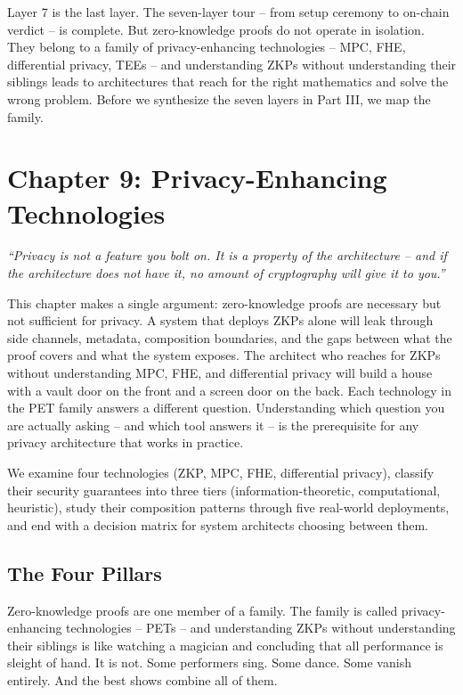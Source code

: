 \documentclass[
  11pt,
  openany]{report}
\begin{document}
Layer 7 is the last layer. The seven-layer tour -- from setup ceremony to
on-chain verdict -- is complete. But zero-knowledge proofs do not operate in
isolation. They belong to a family of privacy-enhancing technologies -- MPC,
FHE, differential privacy, TEEs -- and understanding ZKPs without understanding
their siblings leads to architectures that reach for the right mathematics and
solve the wrong problem. Before we synthesize the seven layers in Part III, we
map the family.

\chapter{Chapter 9: Privacy-Enhancing
Technologies}\label{chapter-9-privacy-enhancing-technologies}

\emph{``Privacy is not a feature you bolt on. It is a property of the
architecture -- and if the architecture does not have it, no amount of
cryptography will give it to you.''}

\par\vspace{18pt}

This chapter makes a single argument: zero-knowledge proofs are necessary but
not sufficient for privacy. A system that deploys ZKPs alone will leak through
side channels, metadata, composition boundaries, and the gaps between what the
proof covers and what the system exposes. The architect who reaches for ZKPs
without understanding MPC, FHE, and differential privacy will build a house with
a vault door on the front and a screen door on the back. Each technology in the
PET family answers a different question. Understanding which question you are
actually asking -- and which tool answers it -- is the prerequisite for any
privacy architecture that works in practice.

We examine four technologies (ZKP, MPC, FHE, differential privacy), classify
their security guarantees into three tiers (information-theoretic,
computational, heuristic), study their composition patterns through five
real-world deployments, and end with a decision matrix for system architects
choosing between them.

\section{The Four Pillars}\label{the-four-pillars}

Zero-knowledge proofs are one member of a family. The family is called
privacy-enhancing technologies -- PETs -- and understanding ZKPs without
understanding their siblings is like watching a magician and concluding that all
performance is sleight of hand. It is not. Some performers sing. Some dance.
Some vanish entirely. And the best shows combine all of them.
\end{document}
